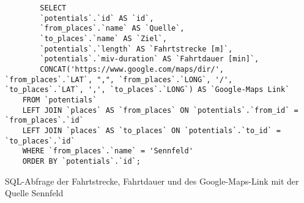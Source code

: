 \begin{listing}[htbp]
    \begin{verbatim}
        SELECT 
        `potentials`.`id` AS `id`, 
        `from_places`.`name` AS `Quelle`,
        `to_places`.`name` AS `Ziel`, 
        `potentials`.`length` AS `Fahrtstrecke [m]`, 
        `potentials`.`miv-duration` AS `Fahrtdauer [min]`,
        CONCAT('https://www.google.com/maps/dir/', `from_places`.`LAT`, ",", `from_places`.`LONG`, '/', `to_places`.`LAT`, ',', `to_places`.`LONG`) AS `Google-Maps Link`
    FROM `potentials`
    LEFT JOIN `places` AS `from_places` ON `potentials`.`from_id` = `from_places`.`id`
    LEFT JOIN `places` AS `to_places` ON `potentials`.`to_id` = `to_places`.`id`
    WHERE `from_places`.`name` = 'Sennfeld'
    ORDER BY `potentials`.`id`;
    \end{verbatim}
    \caption{SQL-Abfrage der Fahrtstrecke, Fahrtdauer und des Google-Maps-Link mit der Quelle Sennfeld}\label{lst-f-sennfeld}
\end{listing}